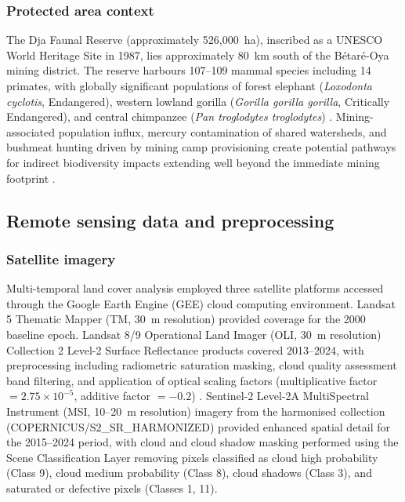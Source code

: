 \documentclass[preprint,12pt,number]{elsarticle}
\begin{document}
\subsubsection{Protected area context}

The Dja Faunal Reserve (approximately 526,000~ha), inscribed as a UNESCO World Heritage Site in 1987, lies approximately 80~km south of the B\'{e}tar\'{e}-Oya mining district. The reserve harbours 107--109 mammal species including 14 primates, with globally significant populations of forest elephant (\textit{Loxodonta cyclotis}, Endangered), western lowland gorilla (\textit{Gorilla gorilla gorilla}, Critically Endangered), and central chimpanzee (\textit{Pan troglodytes troglodytes}) \cite{IUCN2024}. Mining-associated population influx, mercury contamination of shared watersheds, and bushmeat hunting driven by mining camp provisioning create potential pathways for indirect biodiversity impacts extending well beyond the immediate mining footprint \cite{Laurance2006}.


\subsection{Remote sensing data and preprocessing}

\subsubsection{Satellite imagery}

Multi-temporal land cover analysis employed three satellite platforms accessed through the Google Earth Engine (GEE) cloud computing environment. Landsat 5 Thematic Mapper (TM, 30~m resolution) provided coverage for the 2000 baseline epoch. Landsat 8/9 Operational Land Imager (OLI, 30~m resolution) Collection 2 Level-2 Surface Reflectance products covered 2013--2024, with preprocessing including radiometric saturation masking, cloud quality assessment band filtering, and application of optical scaling factors (multiplicative factor $= 2.75 \times 10^{-5}$, additive factor $= -0.2$) \cite{USGS2024}. Sentinel-2 Level-2A MultiSpectral Instrument (MSI, 10--20~m resolution) imagery from the harmonised collection (COPERNICUS/S2\_SR\_HARMONIZED) provided enhanced spatial detail for the 2015--2024 period, with cloud and cloud shadow masking performed using the Scene Classification Layer removing pixels classified as cloud high probability (Class 9), cloud medium probability (Class 8), cloud shadows (Class 3), and saturated or defective pixels (Classes 1, 11).
\end{document}
